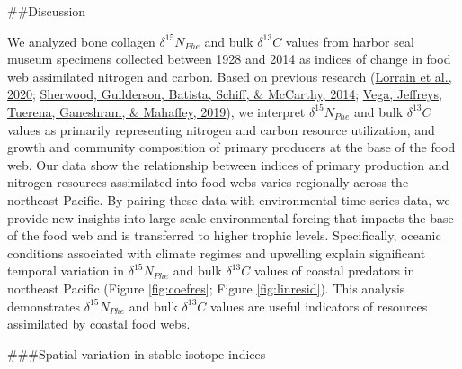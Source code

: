 \documentclass [11pt, proquest] {uwthesis}[2015/03/03]
\begin{document}
\#\#Discussion

We analyzed bone collagen \(\delta^{15}N_{Phe}\) and bulk \(\delta^{13}C\) values from harbor seal museum specimens collected between 1928 and 2014 as indices of change in food web assimilated nitrogen and carbon. Based on previous research (\protect\hyperlink{ref-Lorrain2020}{Lorrain et al., 2020}; \protect\hyperlink{ref-Sherwood2014}{Sherwood, Guilderson, Batista, Schiff, \& McCarthy, 2014}; \protect\hyperlink{ref-delaVega2019}{Vega, Jeffreys, Tuerena, Ganeshram, \& Mahaffey, 2019}), we interpret \(\delta^{15}N_{Phe}\) and bulk \(\delta^{13}C\) values as primarily representing nitrogen and carbon resource utilization, and growth and community composition of primary producers at the base of the food web. Our data show the relationship between indices of primary production and nitrogen resources assimilated into food webs varies regionally across the northeast Pacific. By pairing these data with environmental time series data, we provide new insights into large scale environmental forcing that impacts the base of the food web and is transferred to higher trophic levels. Specifically, oceanic conditions associated with climate regimes and upwelling explain significant temporal variation in \(\delta^{15}N_{Phe}\) and bulk \(\delta^{13}C\) values of coastal predators in northeast Pacific (Figure \ref{fig:coefres}; Figure \ref{fig:linresid}). This analysis demonstrates \(\delta^{15}N_{Phe}\) and bulk \(\delta^{13}C\) values are useful indicators of resources assimilated by coastal food webs.

\#\#\#Spatial variation in stable isotope indices
\end{document}
